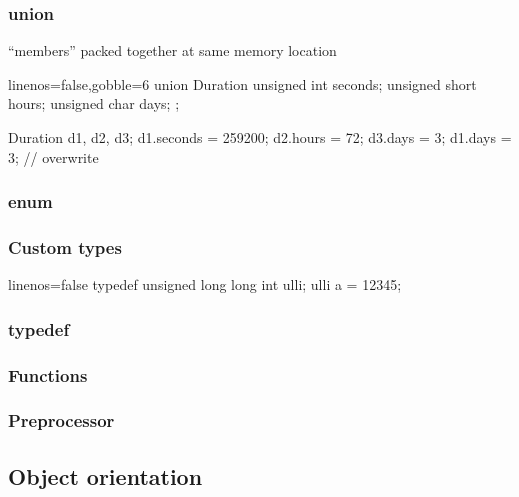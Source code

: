 \begin{frame}[fragile,label=current]
  \frametitle{union}
  \begin{mdframed}[style=simplebox]
    \center ``members'' packed together at same memory location
  \end{mdframed}
  \begin{multicols}{2}
    \begin{cppcode*}{linenos=false,gobble=6}
      union Duration {
        unsigned int seconds;
        unsigned short hours;
        unsigned char days;
      };

      Duration d1, d2, d3;
      d1.seconds = 259200;
      d2.hours = 72;
      d3.days = 3;
      d1.days = 3; // overwrite
    \end{cppcode*}
    \pause
    \columnbreak
  \end{multicols}
\end{frame}

\begin{frame}
  \frametitle{enum}
\end{frame}

\begin{frame}[fragile]
  \frametitle{Custom types}
  \begin{cppcode*}{linenos=false}
    typedef unsigned long long int ulli;
    ulli a = 12345;
  \end{cppcode*}
\end{frame}


\begin{frame}
  \frametitle{typedef}
\end{frame}

\begin{frame}
  \frametitle{Functions}
\end{frame}

\begin{frame}
  \frametitle{Preprocessor}
\end{frame}



\subsection[OO]{Object orientation}

